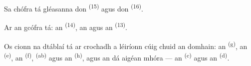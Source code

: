 Sa chófra tá gléasanna don  \textsuperscript{(15)} agus don
 \textsuperscript{(16)}.

Ar an gcófra tá: an  \textsuperscript{(14)}, an  agus an
 \textsuperscript{(13)}.

Os cionn na dtáblaí tá  ar crochadh a léiríonn cúig chuid an
domhain: an  \textsuperscript{(g)}, an 
\textsuperscript{(e)}, an  \textsuperscript{(f)}, 
\textsuperscript{(ab)} agus an  \textsuperscript{(h)}, agus an dá
aigéan mhóra --- an  \textsuperscript{(c)} agus an
 \textsuperscript{(d)}.
\VUsaut{6.0mm}
\VUfilet{22mm}
